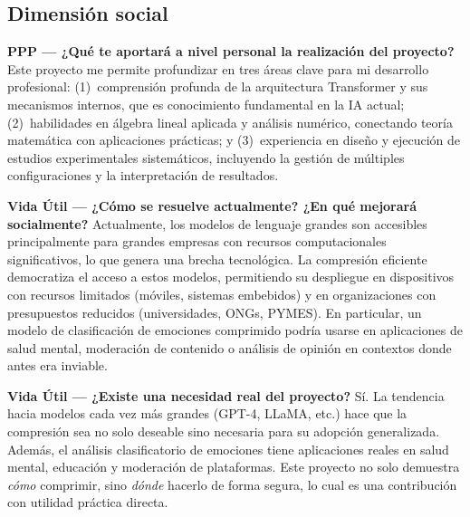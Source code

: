 \documentclass[11pt, a4paper]{article}
\begin{document}
\subsection{Dimensión social}

\textbf{PPP --- ¿Qué te aportará a nivel personal la realización del proyecto?} Este proyecto me permite profundizar en tres áreas clave para mi desarrollo profesional: (1)~comprensión profunda de la arquitectura Transformer y sus mecanismos internos, que es conocimiento fundamental en la IA actual; (2)~habilidades en álgebra lineal aplicada y análisis numérico, conectando teoría matemática con aplicaciones prácticas; y (3)~experiencia en diseño y ejecución de estudios experimentales sistemáticos, incluyendo la gestión de múltiples configuraciones y la interpretación de resultados.

\textbf{Vida Útil --- ¿Cómo se resuelve actualmente? ¿En qué mejorará socialmente?} Actualmente, los modelos de lenguaje grandes son accesibles principalmente para grandes empresas con recursos computacionales significativos, lo que genera una brecha tecnológica. La compresión eficiente democratiza el acceso a estos modelos, permitiendo su despliegue en dispositivos con recursos limitados (móviles, sistemas embebidos) y en organizaciones con presupuestos reducidos (universidades, ONGs, PYMES). En particular, un modelo de clasificación de emociones comprimido podría usarse en aplicaciones de salud mental, moderación de contenido o análisis de opinión en contextos donde antes era inviable.

\textbf{Vida Útil --- ¿Existe una necesidad real del proyecto?} Sí. La tendencia hacia modelos cada vez más grandes (GPT-4, LLaMA, etc.) hace que la compresión sea no solo deseable sino necesaria para su adopción generalizada. Además, el análisis clasificatorio de emociones tiene aplicaciones reales en salud mental, educación y moderación de plataformas. Este proyecto no solo demuestra \textit{cómo} comprimir, sino \textit{dónde} hacerlo de forma segura, lo cual es una contribución con utilidad práctica directa.

\newpage
\printbibliography[heading=bibintoc, title={Referencias}]
\end{document}

